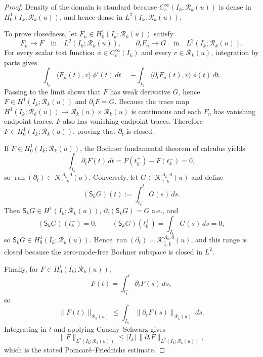 \documentclass[11pt]{article}
\theoremstyle{definition}
\theoremstyle{plain}
\theoremstyle{remark}
\newcommand{\Islab}{I_k}
\begin{document}
\begin{proof}
Density of the domain is standard because \(C_c^\infty(\Islab;\mathcal R_k(u))\) is dense in
\(H_0^1(\Islab;\mathcal R_k(u))\), and hence dense in \(L^2(\Islab;\mathcal R_k(u))\).

To prove closedness, let \(F_n\in H_0^1(\Islab;\mathcal R_k(u))\) satisfy
\[
F_n\to F
\quad\text{in}\quad
L^2(\Islab;\mathcal R_k(u)),
\qquad
\partial_tF_n\to G
\quad\text{in}\quad
L^2(\Islab;\mathcal R_k(u)).
\]
For every scalar test function \(\phi\in C_c^\infty(\Islab)\) and every \(v\in\mathcal R_k(u)\),
integration by parts gives
\[
\int_{\Islab}\!\big\langle F_n(t),v\big\rangle\,\phi'(t)\,dt
=
-\int_{\Islab}\!\big\langle \partial_tF_n(t),v\big\rangle\,\phi(t)\,dt.
\]
Passing to the limit shows that \(F\) has weak derivative \(G\), hence
\(F\in H^1(\Islab;\mathcal R_k(u))\) and \(\partial_tF=G\).
Because the trace map \(H^1(\Islab;\mathcal R_k(u))\to\mathcal R_k(u)\times\mathcal R_k(u)\) is
continuous and each \(F_n\) has vanishing endpoint traces, \(F\) also has vanishing endpoint
traces. Therefore \(F\in H_0^1(\Islab;\mathcal R_k(u))\), proving that \(\partial_t\) is closed.

If \(F\in H_0^1(\Islab;\mathcal R_k(u))\), the Bochner fundamental theorem of calculus yields
\[
\int_{\Islab}\partial_tF(t)\,dt
=
F(t_k^+)-F(t_k^-)
=
0,
\]
so \(\operatorname{ran}(\partial_t)\subset\mathcal K_{\bar 1,k}^{\Lambda_k,0}(u)\).
Conversely, let \(G\in\mathcal K_{\bar 1,k}^{\Lambda_k,0}(u)\) and define
\[
(\mathsf S_kG)(t)
:=
\int_{t_k^-}^{t}G(s)\,ds.
\]
Then \(\mathsf S_kG\in H^1(\Islab;\mathcal R_k(u))\), \(\partial_t(\mathsf S_kG)=G\) a.e., and
\[
(\mathsf S_kG)(t_k^-)=0,
\qquad
(\mathsf S_kG)(t_k^+)=\int_{\Islab}G(s)\,ds=0,
\]
so \(\mathsf S_kG\in H_0^1(\Islab;\mathcal R_k(u))\).
Hence \(\operatorname{ran}(\partial_t)=\mathcal K_{\bar 1,k}^{\Lambda_k,0}(u)\), and this range is
closed because the zero-mode-free Bochner subspace is closed in \(L^2\).

Finally, for \(F\in H_0^1(\Islab;\mathcal R_k(u))\),
\[
F(t)=\int_{t_k^-}^{t}\partial_tF(s)\,ds,
\]
so
\[
\|F(t)\|_{\mathcal R_k(u)}
\le
\int_{\Islab}\|\partial_tF(s)\|_{\mathcal R_k(u)}\,ds.
\]
Integrating in \(t\) and applying Cauchy--Schwarz gives
\[
\|F\|_{L^2(\Islab;\mathcal R_k(u))}
\le
|\Islab|\,\|\partial_tF\|_{L^2(\Islab;\mathcal R_k(u))},
\]
which is the stated Poincar\'e--Friedrichs estimate.
\end{proof}
\end{document}
